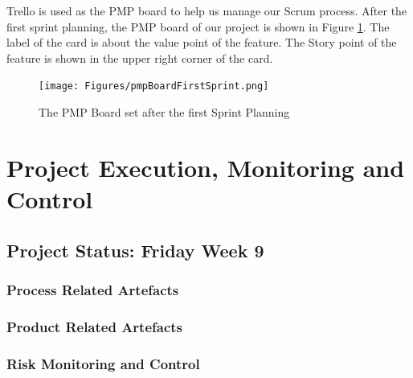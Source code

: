 \documentclass{report}
\begin{document}
Trello is used as the PMP board to help us manage our Scrum process. After the first sprint planning, the PMP board of our project is shown in Figure \ref{fig:firstSprintPmpBoard}. The label of the card is about the value point of the feature. The Story point of the feature is shown in the upper right corner of the card.

\begin{figure}[htp]
\centering
\texttt{[image: Figures/pmpBoardFirstSprint.png]}
\caption{The PMP Board set after the first Sprint Planning}
\label{fig:firstSprintPmpBoard}
\end{figure}


\chapter{Project Execution, Monitoring and Control}
\label{chap:pe}
\section{Project Status: Friday Week 9}
\label{sec:ps1}
\subsection{Process Related Artefacts}
\subsection{Product Related Artefacts}
\subsection{Risk Monitoring and Control}
\end{document}
